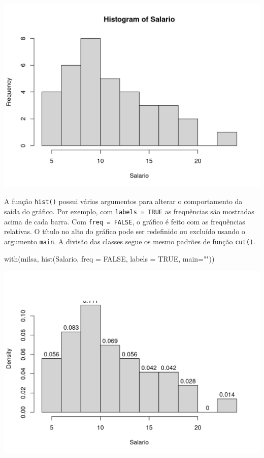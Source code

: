 \documentclass[
  10pt,
  a4paper]{book}
\newenvironment{Shaded}{\begin{snugshade}}{\end{snugshade}}
\newcommand{\AttributeTok}[1]{\textcolor[rgb]{0.77,0.63,0.00}{#1}}
\newcommand{\ConstantTok}[1]{\textcolor[rgb]{0.00,0.00,0.00}{#1}}
\newcommand{\FunctionTok}[1]{\textcolor[rgb]{0.00,0.00,0.00}{#1}}
\newcommand{\NormalTok}[1]{#1}
\newcommand{\StringTok}[1]{\textcolor[rgb]{0.31,0.60,0.02}{#1}}
\begin{document}
\begin{center}\includegraphics{figures/unnamed-chunk-310-1} \end{center}

A função \texttt{hist()} possui vários argumentos para alterar o comportamento
da saída do gráfico. Por exemplo, com \texttt{labels\ =\ TRUE} as frequências são
mostradas acima de cada barra. Com \texttt{freq\ =\ FALSE}, o gráfico é feito com
as frequências relativas. O título no alto do gráfico pode ser redefinido ou excluído usando o argumento \texttt{main}. A divisão das classes segue os mesmo padrões de função \texttt{cut()}.

\begin{Shaded}
\begin{Highlighting}[]
\FunctionTok{with}\NormalTok{(milsa, }\FunctionTok{hist}\NormalTok{(Salario, }\AttributeTok{freq =} \ConstantTok{FALSE}\NormalTok{, }\AttributeTok{labels =} \ConstantTok{TRUE}\NormalTok{, }\AttributeTok{main=}\StringTok{""}\NormalTok{))}
\end{Highlighting}
\end{Shaded}

\begin{center}\includegraphics{figures/unnamed-chunk-311-1} \end{center}
\end{document}
